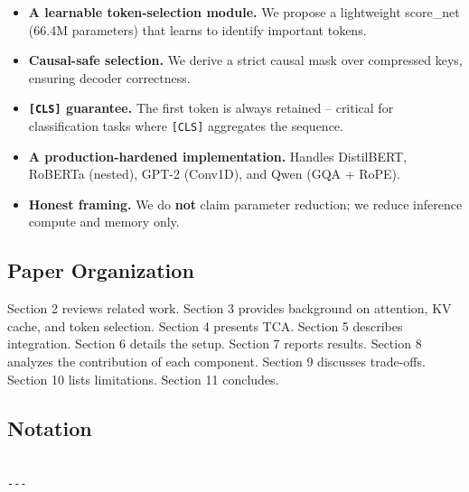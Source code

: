 \begin{itemize}
\item \textbf{A learnable token-selection module.} We propose a lightweight
  score\_net (66.4M parameters) that learns to identify
  important tokens.
\item \textbf{Causal-safe selection.} We derive a strict causal mask over compressed
  keys, ensuring decoder correctness.
\item \textbf{\texttt{[CLS]} guarantee.} The first token is always retained -- critical for
  classification tasks where \texttt{[CLS]} aggregates the sequence.
\item \textbf{A production-hardened implementation.} Handles DistilBERT, RoBERTa
  (nested), GPT-2 (Conv1D), and Qwen (GQA + RoPE).
\item \textbf{Honest framing.} We do \textbf{not} claim parameter reduction; we reduce
  inference compute and memory only.

\end{itemize}
\subsection{Paper Organization}

Section 2 reviews related work. Section 3 provides background on attention, 
KV cache, and token selection. Section 4 presents TCA. Section 5 describes 
integration. Section 6 details the setup. Section 7 reports results. 
Section 8 analyzes the contribution of each component. Section 9 discusses 
trade-offs. Section 10 lists limitations. Section 11 concludes.



\subsection{Notation}

\begin{lstlisting}

---
\end{lstlisting}